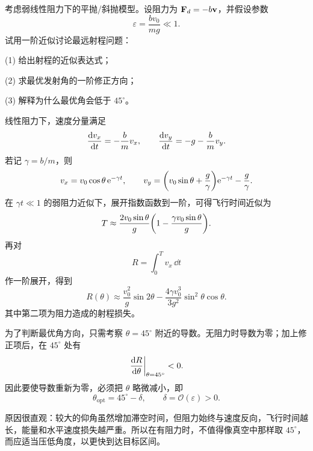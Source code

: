 \begin{problem}
考虑弱线性阻力下的平抛/斜抛模型。设阻力为 $\vb F_d=-b\vb v$，并假设参数
\[
\varepsilon=\frac{b v_0}{mg}\ll 1.
\]
试用一阶近似讨论最远射程问题：

(1) 给出射程的近似表达式；

(2) 求最优发射角的一阶修正方向；

(3) 解释为什么最优角会低于 $45^\circ$。

\begin{solution}
线性阻力下，速度分量满足
\[
\dv{v_x}{t}=-\frac{b}{m}v_x,
\qquad
\dv{v_y}{t}=-g-\frac{b}{m}v_y.
\]
若记 $\gamma=b/m$，则
\[
v_x=v_0\cos\theta\,\mathrm e^{-\gamma t},
\qquad
v_y=\qty(v_0\sin\theta+\frac{g}{\gamma})\mathrm e^{-\gamma t}-\frac{g}{\gamma}.
\]
在 $\gamma t\ll 1$ 的弱阻力近似下，展开指数函数到一阶，可得飞行时间近似为
\[
T\approx \frac{2v_0\sin\theta}{g}\qty(1-\frac{\gamma v_0\sin\theta}{g}).
\]
再对
\[
R=\int_0^T v_x\,\dd t
\]
作一阶展开，得到
\[
R(\theta)\approx \frac{v_0^2}{g}\sin2\theta-\frac{4\gamma v_0^3}{3g^2}\sin^2\theta\cos\theta.
\]
其中第二项为阻力造成的射程损失。

为了判断最优角方向，只需考察 $\theta=45^\circ$ 附近的导数。无阻力时导数为零；加上修正项后，在 $45^\circ$ 处有
\[
\eval{\dv{R}{\theta}}_{\theta=45^\circ}<0.
\]
因此要使导数重新为零，必须把 $\theta$ 略微减小，即
\[
\theta_\text{opt}=45^\circ-\delta,
\qquad \delta=\mathcal O(\varepsilon)>0.
\]

原因很直观：较大的仰角虽然增加滞空时间，但阻力始终与速度反向，飞行时间越长，能量和水平速度损失越严重。所以在有阻力时，不值得像真空中那样取 $45^\circ$，而应适当压低角度，以更快到达目标区间。
\end{solution}
\end{problem}
